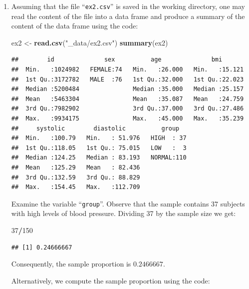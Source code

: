 \documentclass[]{krantz}
\makeatletter
\newenvironment{Shaded}{\begin{snugshade}}{\end{snugshade}}
\newcommand{\DecValTok}[1]{\textcolor[rgb]{0.00,0.00,0.81}{#1}}
\newcommand{\KeywordTok}[1]{\textcolor[rgb]{0.13,0.29,0.53}{\textbf{#1}}}
\newcommand{\NormalTok}[1]{#1}
\newcommand{\OperatorTok}[1]{\textcolor[rgb]{0.81,0.36,0.00}{\textbf{#1}}}
\newcommand{\StringTok}[1]{\textcolor[rgb]{0.31,0.60,0.02}{#1}}
\newenvironment{kframe}{%
\medskip{}
\setlength{\fboxsep}{.8em}
 \def\at@end@of@kframe{}%
 \ifinner\ifhmode%
  \def\at@end@of@kframe{\end{minipage}}%
  \begin{minipage}{\columnwidth}%
 \fi\fi%
 \def\FrameCommand##1{\hskip\@totalleftmargin \hskip-\fboxsep
 \colorbox{shadecolor}{##1}\hskip-\fboxsep
     \hskip-\linewidth \hskip-\@totalleftmargin \hskip\columnwidth}%
 \MakeFramed {\advance\hsize-\width
   \@totalleftmargin\z@ \linewidth\hsize
   \@setminipage}}%
 {\par\unskip\endMakeFramed%
 \at@end@of@kframe}
\renewenvironment{Shaded}{\begin{kframe}}{\end{kframe}}
\theoremstyle{definition}
\theoremstyle{definition}
\theoremstyle{definition}
\theoremstyle{remark}
\makeatother
\begin{document}
\begin{enumerate}
\def\labelenumi{\arabic{enumi}.}
\item
  Assuming that the file ``\texttt{ex2.csv}''
  is saved in the working directory, one may read the content of the file
  into a data frame and produce a summary of the content of the data frame
  using the code:

\begin{Shaded}
\begin{Highlighting}[]
\NormalTok{ex2 <-}\StringTok{ }\KeywordTok{read.csv}\NormalTok{(}\StringTok{"_data/ex2.csv"}\NormalTok{)}
\KeywordTok{summary}\NormalTok{(ex2)}
\end{Highlighting}
\end{Shaded}

\begin{verbatim}
##        id              sex          age              bmi        
##  Min.   :1024982   FEMALE:74   Min.   :26.000   Min.   :15.121  
##  1st Qu.:3172782   MALE  :76   1st Qu.:32.000   1st Qu.:22.023  
##  Median :5200484               Median :35.000   Median :25.157  
##  Mean   :5463304               Mean   :35.087   Mean   :24.759  
##  3rd Qu.:7982902               3rd Qu.:37.000   3rd Qu.:27.486  
##  Max.   :9934175               Max.   :45.000   Max.   :35.239  
##     systolic        diastolic          group    
##  Min.   :100.79   Min.   : 51.976   HIGH  : 37  
##  1st Qu.:118.05   1st Qu.: 75.015   LOW   :  3  
##  Median :124.25   Median : 83.193   NORMAL:110  
##  Mean   :125.29   Mean   : 82.436               
##  3rd Qu.:132.59   3rd Qu.: 88.829               
##  Max.   :154.45   Max.   :112.709
\end{verbatim}

  Examine the variable ``\texttt{group}''. Observe that the sample contains 37
  subjects with high levels of blood pressure. Dividing 37 by the sample
  size we get:

\begin{Shaded}
\begin{Highlighting}[]
\DecValTok{37}\OperatorTok{/}\DecValTok{150}
\end{Highlighting}
\end{Shaded}

\begin{verbatim}
## [1] 0.24666667
\end{verbatim}

  Consequently, the sample proportion is \(0.2466667\).

  Alternatively, we compute the sample proportion using the code:


\end{enumerate}
\end{document}
